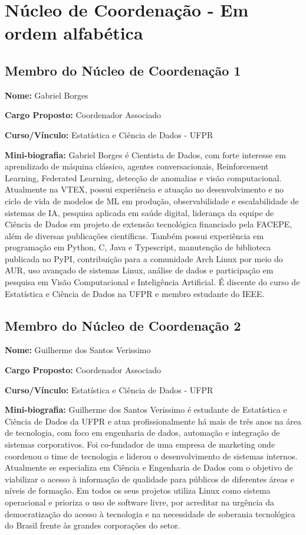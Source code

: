\documentclass[11pt,a4paper]{article}
\begin{document}
\section{Núcleo de Coordenação - Em ordem alfabética}

\subsection{Membro do Núcleo de Coordenação 1}

\textbf{Nome:} Gabriel Borges

\textbf{Cargo Proposto:} Coordenador Associado

\textbf{Curso/Vínculo:} Estatística e Ciência de Dados - UFPR

\textbf{Mini-biografia:}  
Gabriel Borges é Cientista de Dados, com forte interesse em aprendizado de máquina clássico, agentes conversacionais, Reinforcement Learning, Federated Learning, detecção de anomalias e visão computacional. Atualmente na VTEX, possui experiência e atuação no desenvolvimento e no ciclo de vida de modelos de ML em produção, observabilidade e escalabilidade de sistemas de IA, pesquisa aplicada em saúde digital, liderança da equipe de Ciência de Dados em projeto de extensão tecnológica financiado pela FACEPE, além de diversas publicações científicas. Também possui experiência em programação em Python, C, Java e Typescript, manutenção de biblioteca publicada no PyPI, contribuição para a comunidade Arch Linux por meio do AUR, uso avançado de sistemas Linux, análise de dados e participação em pesquisa em Visão Computacional e Inteligência Artificial. É discente do curso de Estatística e Ciência de Dados na UFPR e membro estudante do IEEE.

\vspace{1em}

\subsection{Membro do Núcleo de Coordenação 2}

\textbf{Nome:} Guilherme dos Santos Verissimo

\textbf{Cargo Proposto:} Coordenador Associado

\textbf{Curso/Vínculo:} Estatística e Ciência de Dados - UFPR

\textbf{Mini-biografia:}  
Guilherme dos Santos Verissimo é estudante de Estatística e Ciência de Dados da UFPR e atua profissionalmente há mais de três anos na área de tecnologia, com foco em engenharia de dados, automação e integração de sistemas corporativos. Foi co-fundador de uma empresa de marketing onde coordenou o time de tecnologia e liderou o desenvolvimento de sistemas internos. Atualmente se especializa em Ciência e Engenharia de Dados com o objetivo de viabilizar o acesso à informação de qualidade para públicos de diferentes áreas e níveis de formação. Em todos os seus projetos utiliza Linux como sistema operacional e prioriza o uso de software livre, por acreditar na urgência da democratização do acesso à tecnologia e na necessidade de soberania tecnológica do Brasil frente às grandes corporações do setor.
\vspace{1em}
\end{document}

